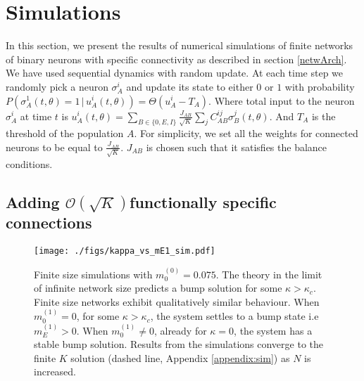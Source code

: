 \section{\label{sec:simulations}Simulations}
In this section, we present the results of numerical simulations of finite networks of binary neurons with specific connectivity as described in section \ref{netwArch}. We have used sequential dynamics with random update. At each time step we randomly pick a neuron $\sigma_A^i$ and update its state to either $0$ or $1$ with probability $P \left(\sigma_A^1(t, \theta) = 1 \,|\, u_A^i(t, \theta) \right) = \Theta(u_A^i - T_A)$. Where total input to the neuron $\sigma_A^i$ at time $t$ is $u_A^i(t, \theta) = \sum_{B \in \lbrace 0, E, I \rbrace} \frac{J_{AB}}{\sqrt{K}} \sum_{j} C_{AB}^{ij} \sigma_B^j(t, \theta)$. And  $T_A$ is the threshold of the population $A$\@. For simplicity, we set all the weights for connected neurons to be equal to $\frac{J_{AB}}{\sqrt{K}}$. $J_{AB}$ is chosen such that it satisfies the balance conditions.
\subsection{Adding $\mathcal{O} (\sqrt{K})$functionally specific connections}
\begin{figure}[b]
\texttt{[image: ./figs/kappa\_vs\_mE1\_sim.pdf]}%
\caption{\label{fig:simME1vsKappa} Finite size simulations with $m_0^{(0)} = 0.075$. The theory in the limit of infinite network size predicts a bump solution for some $\kappa > \kappa_c$. Finite size networks exhibit qualitatively similar behaviour. When $m_0^{(1)} = 0$, for some $\kappa > \kappa_c$, the system settles to a bump state i.e $m_E^{(1)} > 0$. When $m_0^{(1)} \neq 0$, already for $\kappa = 0$, the system has a stable bump solution. Results from the simulations converge to the finite $K$ solution (dashed line, Appendix \ref{appendix:sim}) as $N$ is increased.}  
\end{figure}



